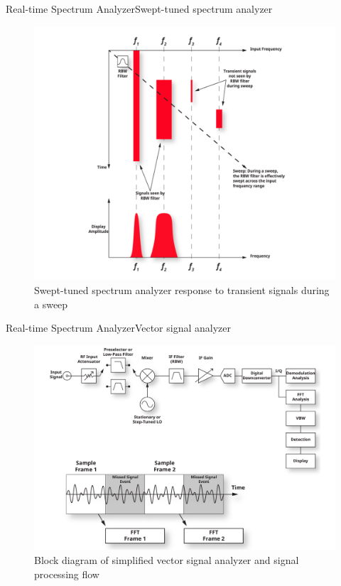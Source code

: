 \begin{frame}{Real-time Spectrum Analyzer}{Swept-tuned spectrum analyzer}
	\begin{figure}
		\centering
		\includegraphics[scale=0.65]{graphics/rtsa_fig1_2.png}
		\caption{Swept-tuned spectrum analyzer response to transient signals during a sweep}
	\end{figure}
\end{frame}
\begin{frame}{Real-time Spectrum Analyzer}{Vector signal analyzer}
	\begin{figure}
		\centering
		\includegraphics[scale=0.7]{graphics/rtsa_fig2.png}
		\caption{Block diagram of simplified vector signal analyzer and signal processing flow}
	\end{figure}
\end{frame}
